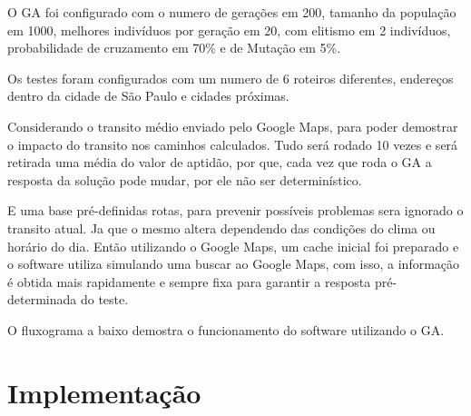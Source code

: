 O GA foi configurado com o numero de gerações em 200, tamanho da população em 1000, melhores indivíduos por geração em 20, com elitismo em 2 indivíduos, probabilidade de cruzamento em 70\% e de Mutação em 5\%.

Os testes foram configurados com um numero de 6 roteiros diferentes, endereços dentro da cidade de São Paulo e cidades próximas.

Considerando o transito médio enviado pelo Google Maps, para poder demostrar o impacto do transito nos caminhos calculados.
Tudo será rodado 10 vezes e será retirada uma média do valor de aptidão, por que, cada vez que roda o GA a resposta da solução pode mudar, por ele não ser determinístico.

E uma base pré-definidas rotas, para prevenir possíveis problemas sera ignorado o transito atual. Ja que o mesmo altera dependendo das condições do clima ou horário do dia. Então utilizando o Google Maps, um cache inicial foi preparado e o software utiliza simulando uma buscar ao Google Maps, com isso, a informação é obtida mais rapidamente e sempre fixa para garantir a resposta pré-determinada do teste.

O fluxograma a baixo demostra o funcionamento do software utilizando o GA.

\begin{center}
	\label{fig:FluxoGA}
\end{center}

\chapter{Implementação}
 
